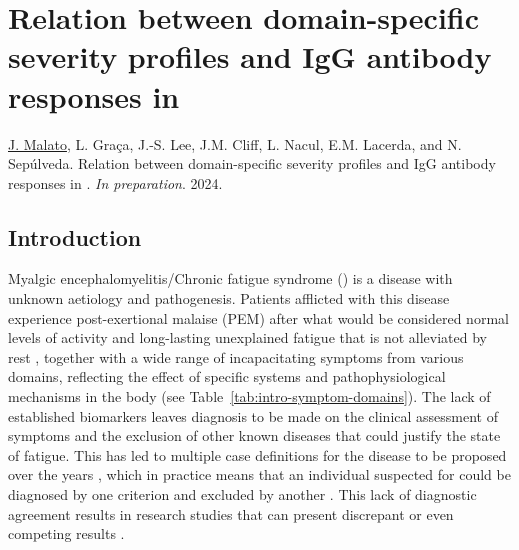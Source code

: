 \chapter[Relation between domain-specific severity profiles and IgG antibody responses in \cfs]{Relation between domain-specific severity profiles and IgG antibody responses in \cfs}
\label{chapter:2024-sym-domains}

\noindent\underline{J. Malato}, L. Graça, J.-S. Lee, J.M. Cliff, L. Nacul, E.M. Lacerda, and N. Sepúlveda. Relation between domain-specific severity profiles and IgG antibody responses in \cfs. \textit{In preparation}. 2024.


\section{Introduction}

Myalgic encephalomyelitis/Chronic fatigue syndrome (\cfs) is a disease with unknown aetiology and pathogenesis.
Patients afflicted with this disease experience post-exertional malaise (PEM) after what would be considered normal levels of activity \citep{carruthers2003MyalgicEncephalomyelitis} and long-lasting unexplained fatigue that is not alleviated by rest \citep{fukuda1994ChronicFatigue}, together with a wide range of incapacitating symptoms from various domains, reflecting the effect of specific systems and pathophysiological mechanisms in the body (see Table~\ref{tab:intro-symptom-domains}).
The lack of established biomarkers leaves \cfs diagnosis to be made on the clinical assessment of symptoms and the exclusion of other known diseases that could justify the state of fatigue.
This has led to multiple case definitions for the disease to be proposed over the years \citep{brurberg2014CaseDefinitions, lim2020ReviewCase}, which in practice means that an individual suspected for \cfs could be diagnosed by one criterion and excluded by another \citep{malato2021Statisticalchallenges}.
This lack of diagnostic agreement results in research studies that can present discrepant or even competing results \citep{nacul2019HowHave}.

